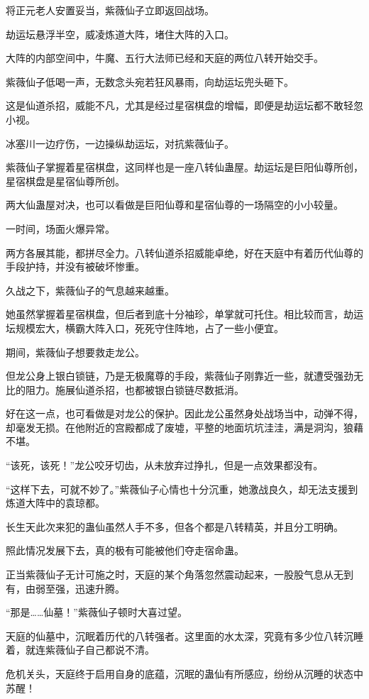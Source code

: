 \begin{this_body}
将正元老人安置妥当，紫薇仙子立即返回战场。

劫运坛悬浮半空，威凌炼道大阵，堵住大阵的入口。

大阵的内部空间中，牛魔、五行大法师已经和天庭的两位八转开始交手。

紫薇仙子低喝一声，无数念头宛若狂风暴雨，向劫运坛兜头砸下。

这是仙道杀招，威能不凡，尤其是经过星宿棋盘的增幅，即便是劫运坛都不敢轻忽小视。

冰塞川一边疗伤，一边操纵劫运坛，对抗紫薇仙子。

紫薇仙子掌握着星宿棋盘，这同样也是一座八转仙蛊屋。劫运坛是巨阳仙尊所创，星宿棋盘是星宿仙尊所创。

两大仙蛊屋对决，也可以看做是巨阳仙尊和星宿仙尊的一场隔空的小小较量。

一时间，场面火爆异常。

两方各展其能，都拼尽全力。八转仙道杀招威能卓绝，好在天庭中有着历代仙尊的手段护持，并没有被破坏惨重。

久战之下，紫薇仙子的气息越来越重。

她虽然掌握着星宿棋盘，但后者到底十分袖珍，单掌就可托住。相比较而言，劫运坛规模宏大，横霸大阵入口，死死守住阵地，占了一些小便宜。

期间，紫薇仙子想要救走龙公。

但龙公身上银白锁链，乃是无极魔尊的手段，紫薇仙子刚靠近一些，就遭受强劲无比的阻力。施展仙道杀招，也都被银白锁链尽数抵消。

好在这一点，也可看做是对龙公的保护。因此龙公虽然身处战场当中，动弹不得，却毫发无损。在他附近的宫殿都成了废墟，平整的地面坑坑洼洼，满是洞沟，狼藉不堪。

“该死，该死！”龙公咬牙切齿，从未放弃过挣扎，但是一点效果都没有。

“这样下去，可就不妙了。”紫薇仙子心情也十分沉重，她激战良久，却无法支援到炼道大阵中的袁琼都。

长生天此次来犯的蛊仙虽然人手不多，但各个都是八转精英，并且分工明确。

照此情况发展下去，真的极有可能被他们夺走宿命蛊。

正当紫薇仙子无计可施之时，天庭的某个角落忽然震动起来，一股股气息从无到有，由弱至强，迅速升腾。

“那是……仙墓！”紫薇仙子顿时大喜过望。

天庭的仙墓中，沉眠着历代的八转强者。这里面的水太深，究竟有多少位八转沉睡着，就连紫薇仙子自己都说不清。

危机关头，天庭终于启用自身的底蕴，沉眠的蛊仙有所感应，纷纷从沉睡的状态中苏醒！


\end{this_body}
